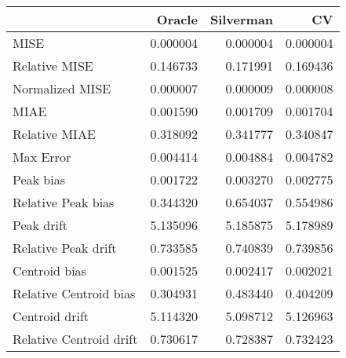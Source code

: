 \begin{tabular}{lrrr}
  \hline
 & Oracle & Silverman & CV \\ 
  \hline
MISE & 0.000004 & 0.000004 & 0.000004 \\ 
  Relative MISE & 0.146733 & 0.171991 & 0.169436 \\ 
  Normalized MISE & 0.000007 & 0.000009 & 0.000008 \\ 
  MIAE & 0.001590 & 0.001709 & 0.001704 \\ 
  Relative MIAE & 0.318092 & 0.341777 & 0.340847 \\ 
  Max Error & 0.004414 & 0.004884 & 0.004782 \\ 
  Peak bias & 0.001722 & 0.003270 & 0.002775 \\ 
  Relative Peak bias & 0.344320 & 0.654037 & 0.554986 \\ 
  Peak drift & 5.135096 & 5.185875 & 5.178989 \\ 
  Relative Peak drift & 0.733585 & 0.740839 & 0.739856 \\ 
  Centroid bias & 0.001525 & 0.002417 & 0.002021 \\ 
  Relative Centroid bias & 0.304931 & 0.483440 & 0.404209 \\ 
  Centroid drift & 5.114320 & 5.098712 & 5.126963 \\ 
  Relative Centroid drift & 0.730617 & 0.728387 & 0.732423 \\ 
   \hline
\end{tabular}
